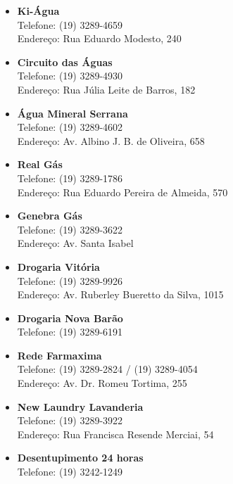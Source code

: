 \begin{itemize}
    \item  \textbf{Ki-Água}
        \\Telefone: (19) 3289-4659
        \\Endereço: Rua Eduardo Modesto, 240

    \item  \textbf{Circuito das Águas}
        \\Telefone: (19) 3289-4930
        \\Endereço: Rua Júlia Leite de Barros, 182

    \item  \textbf{Água Mineral Serrana}
        \\Telefone: (19) 3289-4602
        \\Endereço: Av. Albino J. B. de Oliveira, 658

    \item  \textbf{Real Gás}
        \\Telefone: (19) 3289-1786
        \\Endereço: Rua Eduardo Pereira de Almeida, 570

    \item  \textbf{Genebra Gás}
        \\Telefone: (19) 3289-3622
        \\Endereço: Av. Santa Isabel

    \item  \textbf{Drogaria Vitória}
        \\Telefone: (19) 3289-9926
        \\Endereço: Av. Ruberley Bueretto da Silva, 1015

    \item  \textbf{Drogaria Nova Barão}
        \\Telefone: (19) 3289-6191

    \item  \textbf{Rede Farmaxima}
        \\Telefone: (19) 3289-2824 / (19) 3289-4054
        \\Endereço: Av. Dr. Romeu Tortima, 255

    \item  \textbf{New Laundry Lavanderia}
        \\Telefone: (19) 3289-3922
        \\Endereço: Rua Francisca Resende Merciai, 54

    \item  \textbf{Desentupimento 24 horas}
        \\Telefone: (19) 3242-1249


\end{itemize}
